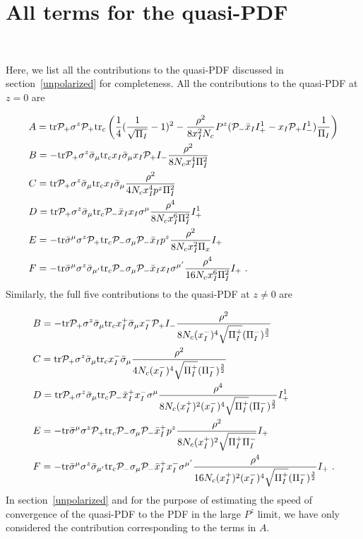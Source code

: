 \documentclass[11pt,aps,amsmath,amssymb,nofootinbib,notitlepage,longbibliography]{revtex4-1}
\begin{document}
\section{All terms for the  quasi-PDF}~\label{ALL}

Here, we list all the contributions to the quasi-PDF discussed in  section~\ref{unpolarized} for completeness.
All the contributions to the quasi-PDF at $z=0$ are



\begin{align}
&A={\rm tr}{\cal P}_+ \sigma^z {\cal P}_+ {\rm tr}_c\left(\frac{1}{4}(\frac{1}{\sqrt{\Pi_I}}-1)^2-\frac{\rho^2}{8x_I^2N_c}P^z({\cal P}_-\bar x_I I_+^1-x_I {\cal P}_+I_-^1)\frac{1}{\Pi_I}\right)\\
&B=-{\rm tr}{\cal P}_+\sigma^z\bar \sigma_{\mu}{\rm tr}_c x_I\bar \sigma_{\mu}x_I{\cal P}_+ I_- \frac{\rho^2}{8N_cx_I^4 \Pi_I^2}\\
&C={\rm tr}{\cal P}_+\sigma^z\bar \sigma_{\mu}{\rm tr}_c x_I\bar \sigma_{\mu}\frac{\rho^2}{4N_cx_I^4p^z\Pi_I^2} \\
&D={\rm tr}{\cal P}_+\sigma^z\bar \sigma_{\mu}{\rm tr}_c {\cal P}_-\bar x_I x_I\sigma^{\mu}\frac{\rho^4}{8N_cx_I^6 \Pi_I^2} I_+^1\\
&E=-{\rm tr}\bar \sigma^{\mu}\sigma^z {\cal P}_+{\rm tr}_c {\cal P}_-\sigma_{\mu}{\cal P}_-\bar x_I p^z\frac{\rho^2}{8N_cx_I^2\Pi_x}I_+ \\
&F=-{\rm tr}\bar \sigma^{\mu}\sigma^z\bar \sigma_{\mu'}{\rm tr}_c {\cal P}_-\sigma_{\mu}{\cal P}_-\bar x_I x_I \sigma^{\mu'}\frac{\rho^4}{16N_cx_I^6\Pi_I^2}I_+ \ .
\end{align}
Similarly, the full five contributions to the quasi-PDF at $z\neq 0$ are

\begin{align}
&B=-{\rm tr}{\cal P}_+\sigma^z\bar \sigma_{\mu}{\rm tr}_c x^+_I\bar \sigma_{\mu}x^-_I{\cal P}_+ I_- \frac{\rho^2}{8N_c(x^-_I)^4 \sqrt{\Pi_I^+}(\Pi_I^-)^{\frac{3}{2}}}\\
&C={\rm tr}{\cal P}_+\sigma^z\bar \sigma_{\mu}{\rm tr}_c x^-_I\bar \sigma_{\mu}\frac{\rho^2}{4N_c(x^-_I)^4 \sqrt{\Pi_I^+}(\Pi_I^-)^{\frac{3}{2}}} \\
&D={\rm tr}{\cal P}_+\sigma^z\bar \sigma_{\mu}{\rm tr}_c {\cal P}_-\bar x^+_I x^-_I\sigma^{\mu}\frac{\rho^4}{8N_c(x^+_I)^2(x^-_I)^4\sqrt{\Pi_I^+}(\Pi_I^-)^{\frac{3}{2}}} I_+^1\\
&E=-{\rm tr}\bar \sigma^{\mu}\sigma^z {\cal P}_+{\rm tr}_c {\cal P}_-\sigma_{\mu}{\cal P}_-\bar x^+_I p^z\frac{\rho^2}{8N_c(x^+_I)^2\sqrt{\Pi_I^+\Pi_I^-}}I_+ \\
&F=-{\rm tr}\bar \sigma^{\mu}\sigma^z\bar \sigma_{\mu'}{\rm tr}_c {\cal P}_-\sigma_{\mu}{\cal P}_-\bar x^+_I x^-_I \sigma^{\mu'}\frac{\rho^4}{16N_c(x^+_I)^2(x^-_I)^4\sqrt{\Pi_I^+}(\Pi_I^-)^{\frac{3}{2}}}I_+ \ .
\end{align}
In section~\ref{unpolarized} and
for the purpose of estimating the speed of convergence of the quasi-PDF to the PDF in the large $P^z$ limit,
we have only considered the contribution corresponding to the terms in $A$.






\end{document}
